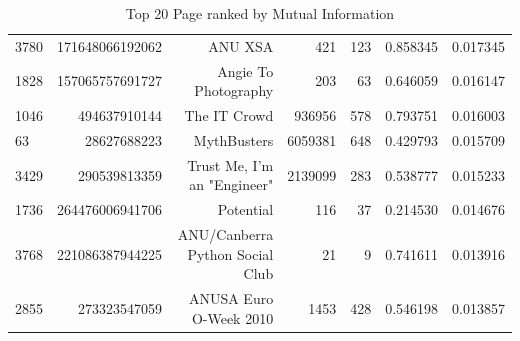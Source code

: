 \begin{table}
\begin{tabular}{| >{\small}l | >{\small}r | >{\small}r | >{\small}r | >{\small}r | >{\small}r |>{\small}r |}
3780 &  171648066192062 &                                            ANU XSA &       421 &      123 &             0.858345 &            0.017345 \\
1828 &  157065757691727 &                               Angie To Photography &       203 &       63 &             0.646059 &            0.016147 \\
1046 &     494637910144 &                                       The IT Crowd &    936956 &      578 &             0.793751 &            0.016003 \\
63   &      28627688223 &                                        MythBusters &   6059381 &      648 &             0.429793 &            0.015709 \\
3429 &     290539813359 &                        Trust Me, I'm an "Engineer" &   2139099 &      283 &             0.538777 &            0.015233 \\
1736 &  264476006941706 &                                          Potential &       116 &       37 &             0.214530 &            0.014676 \\
3768 &  221086387944225 &                    ANU/Canberra Python Social Club &        21 &        9 &             0.741611 &            0.013916 \\
2855 &     273323547059 &                             ANUSA Euro O-Week 2010 &      1453 &      428 &             0.546198 &            0.013857 \\
\hline
\end{tabular}
\caption{Top 20 Page ranked by Mutual Information}
\label {Top 20 Page ranked by Mutual Information}
\end{table}
	